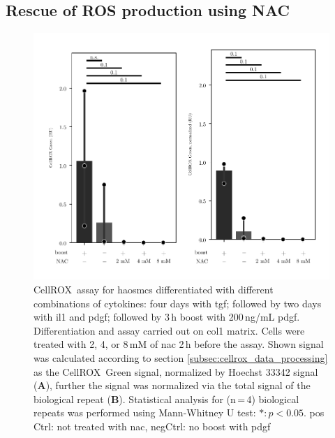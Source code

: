     \subsection{Rescue of ROS production using NAC}
        \begin{figure}[h!]
    \capstart
        \centering
    	\includegraphics{Abbildung/NAC_quench.pdf}

    	\begin{minipage}{\captionwidth}
    		\caption[NAC quench]{ \newline
            CellROX\texttrademark~assay for \acp{haosmc} differentiated with different combinations of cytokines: four days with \ac{tgf}; followed by two days with \ac{il1} and \ac{pdgf}; followed by 3\,h boost with 200\,ng/mL \ac{pdgf}. Differentiation and assay carried out on \ac{col1} matrix. Cells were treated with 2, 4, or 8\,mM of \ac{nac} 2\,h before the assay.
            Shown signal was calculated according to section \ref{subsec:cellrox_data_processing} as the CellROX\texttrademark~Green signal, normalized by Hoechst 33342 signal (\textbf{A}), further the signal was normalized via the total signal of the biological repeat (\textbf{B}). Statistical analysis for (n\,=\,4) biological repeats was performed using Mann-Whitney U test: $*: p < 0.05$.
            pos Ctrl: not treated with \ac{nac}, negCtrl: no boost with \ac{pdgf}}
    		\label{fig:NAC_quench}
    	\end{minipage}
    \end{figure}

